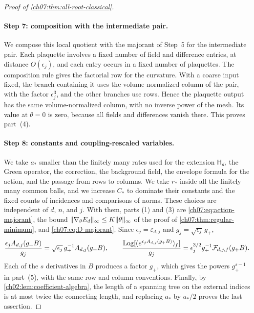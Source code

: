 \begin{proof}[Proof of \cref{ch07:thm:all-root-classical}]
\paragraph{Step 7: composition with the intermediate pair.}
We compose this local quotient with the majorant of Step~5 for the intermediate pair. Each plaquette involves a fixed number of field and difference entries, at distance $O(\epsilon_j)$, and each entry occurs in a fixed number of plaquettes. The composition rule gives the factorial row for the curvature. With a coarse input fixed, the branch containing it uses the volume-normalized column of the pair, with the factor $\epsilon_j^3$, and the other branches use rows. Hence the plaquette output has the same volume-normalized column, with no inverse power of the mesh. Its value at $\theta=0$ is zero, because all fields and differences vanish there. This proves part~(4).

\paragraph{Step 8: constants and coupling-rescaled variables.}
We take $a_*$ smaller than the finitely many rates used for the extension $\mathsf H_d$, the Green operator, the correction, the background field, the envelope formula for the action, and the passage from rows to columns. We take $r_*$ inside all the finitely many common balls, and we increase $C_*$ to dominate their constants and the fixed counts of incidences and comparisons of norms. These choices are independent of $d$, $n$, and $j$. With them, parts (1) and (3) are \eqref{ch07:eq:action-majorant}, the bound $\lVert \nabla_\theta E_d\rVert_\infty\le K\lVert \theta\rVert_\infty$ of the proof of \cref{ch07:thm:regular-minimum}, and \eqref{ch07:eq:D-majorant}. Since $\epsilon_j=\varepsilon_{d,j}$ and $g_j=\sqrt{\epsilon_j}\,g_+$,
\[
 \frac{\epsilon_jA_{d,j}(g_+B)}{g_j}=\sqrt{\epsilon_j}\,g_+^{-1}A_{d,j}(g_+B),\qquad
 \frac{\operatorname{Log}[(e^{\epsilon_jA_{d,j}(g_+B)})_f]}{g_j}=\epsilon_j^{3/2}g_+^{-1}\mathcal F_{d,j,f}(g_+B).
\]
Each of the $s$ derivatives in $B$ produces a factor $g_+$, which gives the powers $g_+^{s-1}$ in part~(5), with the same row and column conventions. Finally, by \cref{ch02:lem:coefficient-algebra}, the length of a spanning tree on the external indices is at most twice the connecting length, and replacing $a_*$ by $a_*/2$ proves the last assertion.
\end{proof}
